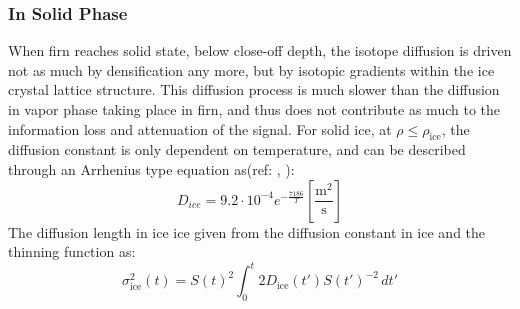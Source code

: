 \documentclass[../../CompleteThesis2/Complete_2ndDraft]{subfiles}
\begin{document}
\subsubsection{In Solid Phase}
\label{Subsubsec:Ice_DiffusionAndDensification_Diffusion_Ice}
When firn reaches solid state, below close-off depth, the isotope diffusion is driven not as much by densification any more, but by isotopic gradients within the ice crystal lattice structure. This diffusion process is much slower than the diffusion in vapor phase taking place in firn, and thus does not contribute as much to the information loss and attenuation of the signal. For solid ice, at $\rho \leq \rho_{\text{ice}}$, the diffusion constant is only dependent on temperature, and can be described through an Arrhenius type equation as(ref: \cite[Ramseyer, 1967]{RAMSEIER1967}, \cite[Johnsen et al., 2000]{Johnsen2000}):
\begin{equation}
	D_{ice} = 9.2 \cdot 10^{-4} e^{-\frac{7186}{T}} 	\left[\frac{\text{m}^2}{\text{s}}\right]
	\label{Eq:Ice_Diff_const}
\end{equation}
The diffusion length in ice ice given from the diffusion constant in ice and the thinning function as:
\begin{equation}
	\sigma^2_{\text{ice}}(t) = S(t)^2 \int_{0}^{t}2 D_{\text{ice}}(t') S(t')^{-2} \, dt'
	\label{Eq:Diff_Len_Ice}
\end{equation}


\label{Subsec:Ice_DiffusionAndDensification_SignalAttenuation}
\end{document}
